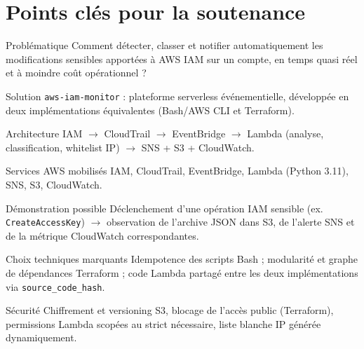 \documentclass[11pt,a4paper]{report}
\begin{document}
\chapter*{Points clés pour la soutenance}

\begin{keybox}{Problématique}
Comment détecter, classer et notifier automatiquement les modifications sensibles apportées à AWS IAM sur un compte, en temps quasi réel et à moindre coût opérationnel ?
\end{keybox}

\begin{keybox}{Solution}
\texttt{aws-iam-monitor} : plateforme serverless événementielle, développée en deux implémentations équivalentes (Bash/AWS CLI et Terraform).
\end{keybox}

\begin{keybox}{Architecture}
IAM $\rightarrow$ CloudTrail $\rightarrow$ EventBridge $\rightarrow$ Lambda (analyse, classification, whitelist IP) $\rightarrow$ SNS + S3 + CloudWatch.
\end{keybox}

\begin{keybox}{Services AWS mobilisés}
IAM, CloudTrail, EventBridge, Lambda (Python 3.11), SNS, S3, CloudWatch.
\end{keybox}

\begin{keybox}{Démonstration possible}
Déclenchement d'une opération IAM sensible (ex. \texttt{CreateAccessKey}) $\rightarrow$ observation de l'archive JSON dans S3, de l'alerte SNS et de la métrique CloudWatch correspondantes.
\end{keybox}

\begin{keybox}{Choix techniques marquants}
Idempotence des scripts Bash ; modularité et graphe de dépendances Terraform ; code Lambda partagé entre les deux implémentations via \texttt{source\_code\_hash}.
\end{keybox}

\begin{keybox}{Sécurité}
Chiffrement et versioning S3, blocage de l'accès public (Terraform), permissions Lambda scopées au strict nécessaire, liste blanche IP générée dynamiquement.
\end{keybox}
\end{document}

